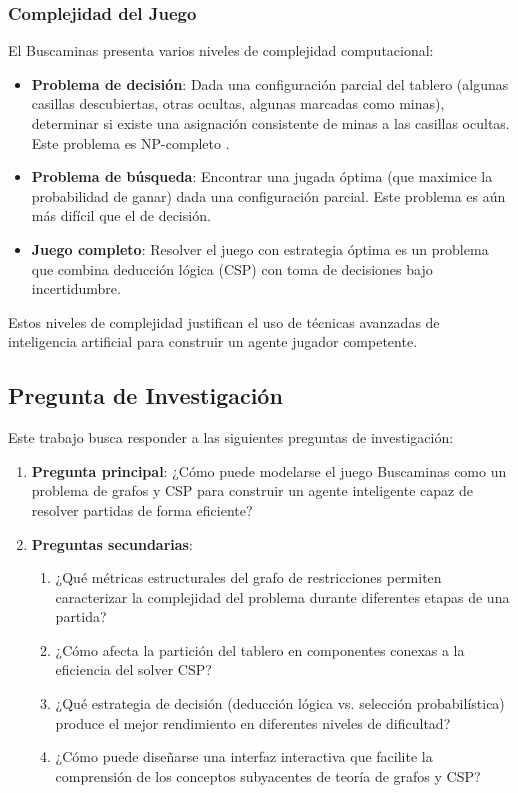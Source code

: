 \documentclass[12pt,a4paper]{article}
\begin{document}
\subsubsection{Complejidad del Juego}

El Buscaminas presenta varios niveles de complejidad computacional:

\begin{itemize}[itemsep=2pt]
    \item \textbf{Problema de decisión}: Dada una configuración parcial del tablero (algunas casillas descubiertas, otras ocultas, algunas marcadas como minas), determinar si existe una asignación consistente de minas a las casillas ocultas. Este problema es NP-completo \cite{kaye2000minesweeper}.

    \item \textbf{Problema de búsqueda}: Encontrar una jugada óptima (que maximice la probabilidad de ganar) dada una configuración parcial. Este problema es aún más difícil que el de decisión.

    \item \textbf{Juego completo}: Resolver el juego con estrategia óptima es un problema que combina deducción lógica (CSP) con toma de decisiones bajo incertidumbre.
\end{itemize}

Estos niveles de complejidad justifican el uso de técnicas avanzadas de inteligencia artificial para construir un agente jugador competente.

\subsection{Pregunta de Investigación}

Este trabajo busca responder a las siguientes preguntas de investigación:

\begin{enumerate}[itemsep=2pt]
    \item \textbf{Pregunta principal}: ¿Cómo puede modelarse el juego Buscaminas como un problema de grafos y CSP para construir un agente inteligente capaz de resolver partidas de forma eficiente?

    \item \textbf{Preguntas secundarias}:
    \begin{enumerate}[itemsep=2pt]
        \item ¿Qué métricas estructurales del grafo de restricciones permiten caracterizar la complejidad del problema durante diferentes etapas de una partida?
        \item ¿Cómo afecta la partición del tablero en componentes conexas a la eficiencia del solver CSP?
        \item ¿Qué estrategia de decisión (deducción lógica vs. selección probabilística) produce el mejor rendimiento en diferentes niveles de dificultad?
        \item ¿Cómo puede diseñarse una interfaz interactiva que facilite la comprensión de los conceptos subyacentes de teoría de grafos y CSP?
    \end{enumerate}
\end{enumerate}
\end{document}
